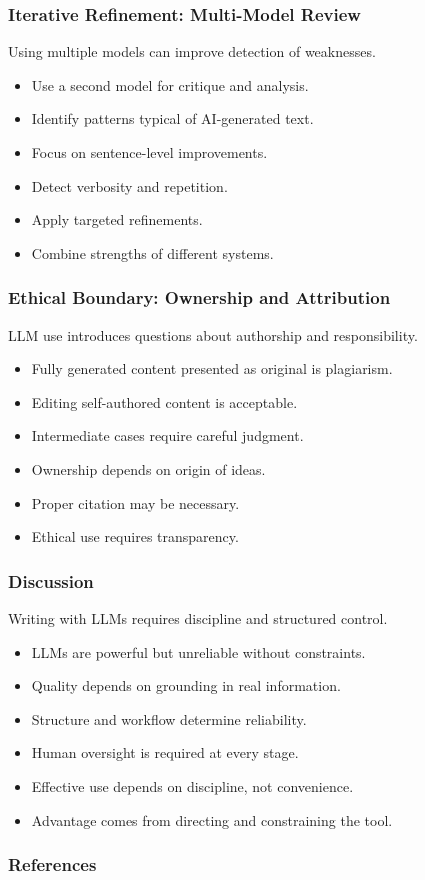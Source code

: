 \documentclass{beamer}
\begin{document}
\frame
{
   \frametitle{Iterative Refinement: Multi-Model Review}

    Using multiple models can improve detection of weaknesses.

    \begin{itemize}
        \item Use a second model for critique and analysis.
        \item Identify patterns typical of AI-generated text.
        \item Focus on sentence-level improvements.
        \item Detect verbosity and repetition.
        \item Apply targeted refinements.
        \item Combine strengths of different systems.
    \end{itemize}
}

\frame
{
   \frametitle{Ethical Boundary: Ownership and Attribution}

    LLM use introduces questions about authorship and responsibility.

    \begin{itemize}
        \item Fully generated content presented as original is plagiarism.
        \item Editing self-authored content is acceptable.
        \item Intermediate cases require careful judgment.
        \item Ownership depends on origin of ideas.
        \item Proper citation may be necessary.
        \item Ethical use requires transparency.
    \end{itemize}
}

\frame
{
   \frametitle{Discussion}

    Writing with LLMs requires discipline and structured control.

    \begin{itemize}
        \item LLMs are powerful but unreliable without constraints.
        \item Quality depends on grounding in real information.
        \item Structure and workflow determine reliability.
        \item Human oversight is required at every stage.
        \item Effective use depends on discipline, not convenience.
        \item Advantage comes from directing and constraining the tool.
    \end{itemize}
}

\begin{frame}[t,allowframebreaks]
\frametitle{References}
\printbibliography
\end{frame}
\end{document}
